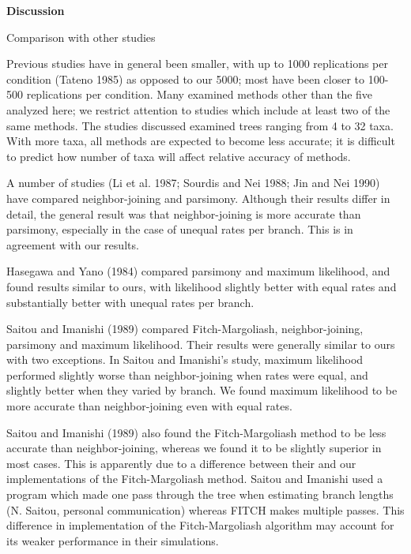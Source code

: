 \newpage
\noindent
{\bf Discussion}
\bigskip

\bigskip

\noindent
Comparison with other studies
\bigskip


 Previous studies have in 
general been smaller, with up to 1000 replications per condition 
(Tateno 1985) as opposed to our 5000; most have been closer to 
100-500 replications per condition.  Many examined methods other 
than the five analyzed here; we restrict attention to studies which 
include at least two of the same methods.  The studies discussed 
examined trees ranging from 4 to 32 taxa.  With more taxa, all methods
are expected to become less accurate; it is difficult to predict 
how number of taxa will affect relative accuracy of methods.

	A number of studies (Li et al. 1987; Sourdis and Nei 1988; Jin 
and Nei 1990) have compared  neighbor-joining and
parsimony.  Although their results differ in detail, the general result 
was that neighbor-joining is more accurate than parsimony, especially 
in the case of unequal rates per branch.
This is in agreement with our results.

	Hasegawa and Yano (1984) compared parsimony and maximum 
likelihood, and found results similar to ours, with likelihood slightly 
better with equal rates and substantially better with unequal rates 
per branch.

	Saitou and Imanishi (1989) compared Fitch-Margoliash, 
neighbor-joining, parsimony and maximum likelihood.  Their results 
were generally similar to ours with two exceptions.  In Saitou and 
Imanishi's study, maximum likelihood performed slightly worse than 
neighbor-joining when rates were equal, and slightly better when 
they varied by branch.  We found maximum likelihood to be more 
accurate than neighbor-joining even with equal rates.

	 Saitou and Imanishi (1989) also found the Fitch-Margoliash 
method to be less accurate than neighbor-joining, whereas we found 
it to be slightly superior in most cases.  This is apparently due to a 
difference between their and our implementations of the Fitch-Margoliash
method.  Saitou and Imanishi used a program which made one pass through the
tree when estimating branch lengths (N. Saitou, personal communication) 
whereas FITCH makes multiple passes.  This difference in implementation
of the Fitch-Margoliash algorithm may account for its weaker
performance in their simulations.
\bigskip

\bigskip

